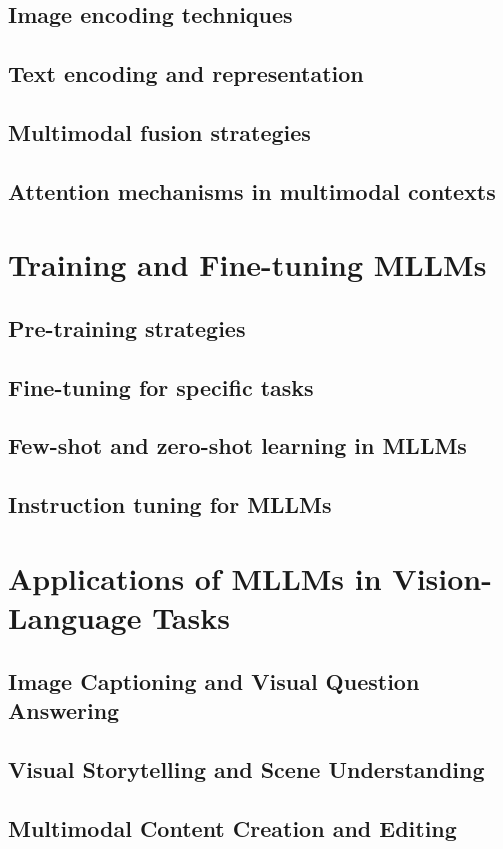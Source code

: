 \documentclass{book}
\begin{document}
\section{Image encoding techniques}
\section{Text encoding and representation}
\section{Multimodal fusion strategies}
\section{Attention mechanisms in multimodal contexts}

\chapter{Training and Fine-tuning MLLMs}
\section{Pre-training strategies}
\section{Fine-tuning for specific tasks}
\section{Few-shot and zero-shot learning in MLLMs}
\section{Instruction tuning for MLLMs}

\chapter{Applications of MLLMs in Vision-Language Tasks}
\section{Image Captioning and Visual Question Answering}
\section{Visual Storytelling and Scene Understanding}
\section{Multimodal Content Creation and Editing}
\end{document}
